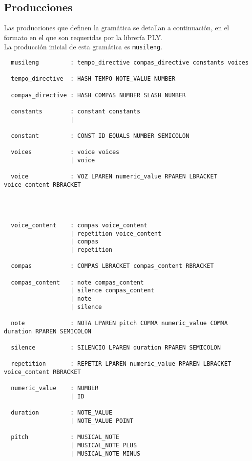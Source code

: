 \documentclass[a4paper,8pt]{article}
\begin{document}
\subsection{Producciones}
Las producciones que definen la gramática se detallan a continuación, en el formato en el que son requeridas por la librería PLY. \\La producción inicial de esta gramática es \texttt{musileng}.

\begin{verbatim}
  musileng         : tempo_directive compas_directive constants voices

  tempo_directive  : HASH TEMPO NOTE_VALUE NUMBER
  
  compas_directive : HASH COMPAS NUMBER SLASH NUMBER
  
  constants        : constant constants
                   | 
                   
  constant         : CONST ID EQUALS NUMBER SEMICOLON
  
  voices           : voice voices
                   | voice
                   
  voice            : VOZ LPAREN numeric_value RPAREN LBRACKET voice_content RBRACKET
  
  
  
  
  voice_content    : compas voice_content
                   | repetition voice_content
                   | compas
                   | repetition
                   
  compas           : COMPAS LBRACKET compas_content RBRACKET
  
  compas_content   : note compas_content
                   | silence compas_content
                   | note
                   | silence
                   
  note             : NOTA LPAREN pitch COMMA numeric_value COMMA duration RPAREN SEMICOLON
  
  silence          : SILENCIO LPAREN duration RPAREN SEMICOLON
  
  repetition       : REPETIR LPAREN numeric_value RPAREN LBRACKET voice_content RBRACKET
  
  numeric_value    : NUMBER
                   | ID
                   
  duration         : NOTE_VALUE
                   | NOTE_VALUE POINT
                   
  pitch            : MUSICAL_NOTE
                   | MUSICAL_NOTE PLUS
                   | MUSICAL_NOTE MINUS
\end{verbatim}
\end{document}
